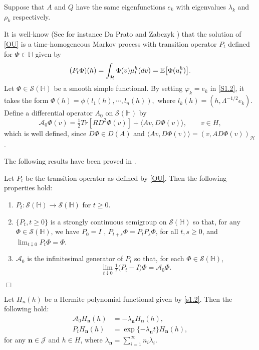 \documentclass[review,onefignum,onetabnum]{siamart190516}
\begin{document}
Suppose that $A$ and $Q$ have the same eigenfunctions $e_k$ with eigenvalues
$\lambda_k$ and $\rho_k$ respectively.

    It is well-know (See for instance Da Prato and Zabczyk \cite{da-za}) that
the solution of \eqref{OU} is a time-homogeneous Markov process with transition
operator $P_t$  defined for $\Phi\in\mathbb{H}$ given by
\begin{equation}
    (P_t\Phi)(h)=
        \int_{\mathcal{H}}
             \Phi(v) \mu_t ^ h(dv)
             = \mathbb{E}
             \big[
                \Phi(u_t^h)
             \big].
\end{equation}
    Let $\Phi\in\mathcal{S}(\mathbb{H})$ be a smooth simple functional. By
setting $\varphi_k = e_k$ in \eqref{S1.2}, it takes the form
$
  \Phi(h) = \phi(l_1(h), \cdots, l_n (h)),
$
where $l_k(h) = (h, \Lambda^{-1/2} e_k )$. Define a differential operator
$A_0$
on $\mathcal{S}(\mathbb{H})$ by
\begin{equation}\label{def-A0}
  \mathcal{A}_0
    \Phi(v) = \tfrac{1}{2}Tr [RD^2 \Phi(v)] + \langle Av, D\Phi(v)\rangle
    ,\qquad v \in H,
\end{equation}
which is well defined, since $D\Phi \in D(A)$ and
$\langle Av, D\Phi(v)\rangle = (v, A D \Phi(v))_\mathcal{H}$.

The following results have been proved in \cite{liu}.
\begin{lemma}
    Let $P_t$ be the transition operator as defined by \eqref{OU}. Then
    the following properties hold:
    \begin{enumerate}
     \item
        $P_t : \mathcal{S}(\mathbb{H})\rightarrow  \mathcal{S}(\mathbb{H})$
        for $t \ge 0$.
    \item
        $\{P_t , t \ge 0\}$
        is a strongly continuous semigroup on
        $\mathcal{S}(\mathbb{H})$ so that, for any
        $\Phi \in \mathcal{S}(\mathbb{H})$, we have $P_0 = I$ ,
        $P_{t+s} \Phi = P_t P_s \Phi$, for all $t, s \ge 0$, and
        $\lim_{t\downarrow 0}
        P_t \Phi = \Phi$.
    \item
        $\mathcal{A}_0$ is the infinitesimal generator of $P_t$ so that, for
        each $\Phi\in\mathcal{S}(\mathbb{H})$,
        \[
            \lim_{t\downarrow 0} \tfrac{1}{t}\big(P_t- I\big)\Phi
                = \mathcal{A}_0\Phi.
        \]
    \end{enumerate}
    \hfill $\Box$
\end{lemma}

\begin{lemma}\label{Pt-Her}
        Let $H_n(h)$ be a Hermite polynomial functional given by \eqref{s1.2}.
        Then the following hold:
    \begin{align}
        \mathcal{A}_0 H_{\mathbf{n}}(h) 
            &= -\lambda_{\mathbf{n}} H_{\mathbf{n}}(h),
            \\
        P_t H_{\mathbf{n}} (h)
            &= \exp\{-\lambda_{\mathbf{n}} t\} H_{\mathbf{n}} (h),
    \end{align}
    for any $\mathbf{n}\in\mathcal{J}$ and $h \in H$, where
    $
        \displaystyle
        \lambda_{\mathbf{n}}=\sum_{i=1}^\infty n_i\lambda_i.
    $
\end{lemma}
\end{document}
